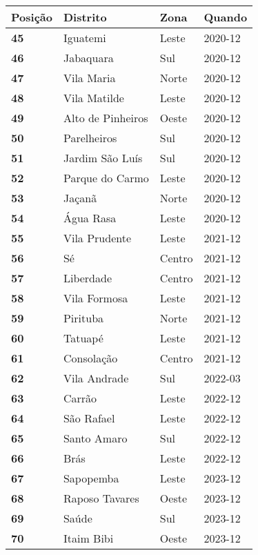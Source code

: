 \begin{table}[H]
	\centering
	\begin{tabular}{l|l|l|l}
	\textbf{Posição} & \textbf{Distrito} & \textbf{Zona} & \textbf{Quando} \\ \hline
		\textbf{45} & Iguatemi & Leste & 2020-12\\ \hline
		\textbf{46} & Jabaquara & Sul & 2020-12\\ \hline
		\textbf{47} & Vila Maria & Norte & 2020-12\\ \hline
		\textbf{48} & Vila Matilde & Leste & 2020-12\\ \hline
		\textbf{49} & Alto de Pinheiros & Oeste & 2020-12\\ \hline
		\textbf{50} & Parelheiros & Sul & 2020-12\\ \hline
		\textbf{51} & Jardim São Luís & Sul & 2020-12\\ \hline
		\textbf{52} & Parque do Carmo & Leste & 2020-12\\ \hline
		\textbf{53} & Jaçanã & Norte & 2020-12\\ \hline
		\textbf{54} & Água Rasa & Leste & 2020-12\\ \hline
		\textbf{55} & Vila Prudente & Leste & 2021-12\\ \hline
		\textbf{56} & Sé & Centro & 2021-12\\ \hline
		\textbf{57} & Liberdade & Centro & 2021-12\\ \hline
		\textbf{58} & Vila Formosa & Leste & 2021-12\\ \hline
		\textbf{59} & Pirituba & Norte & 2021-12\\ \hline
		\textbf{60} & Tatuapé & Leste & 2021-12\\ \hline
		\textbf{61} & Consolação & Centro & 2021-12\\ \hline
		\textbf{62} & Vila Andrade & Sul & 2022-03\\ \hline
		\textbf{63} & Carrão & Leste & 2022-12\\ \hline
		\textbf{64} & São Rafael & Leste & 2022-12\\ \hline
		\textbf{65} & Santo Amaro & Sul & 2022-12\\ \hline
		\textbf{66} & Brás & Leste & 2022-12\\ \hline
		\textbf{67} & Sapopemba & Leste & 2023-12\\ \hline
		\textbf{68} & Raposo Tavares & Oeste & 2023-12\\ \hline
		\textbf{69} & Saúde & Sul & 2023-12\\ \hline
		\textbf{70} & Itaim Bibi & Oeste & 2023-12\\ \hline

\end{tabular}
\end{table}
